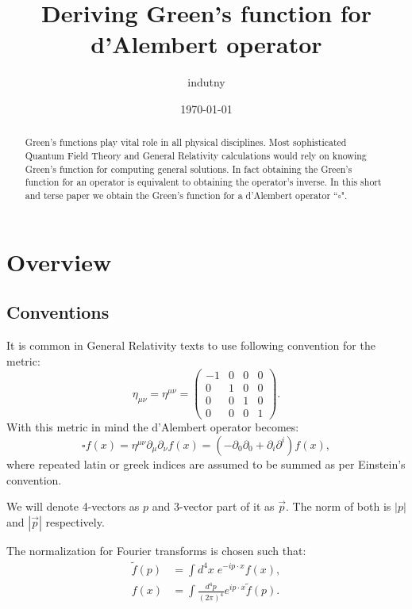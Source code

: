 \documentclass[aps,prd,final,twocolumn,floats,floatfix,nofootinbib,10pt]{revtex4-1}
\begin{document}
\title{Deriving Green's function for d'Alembert operator}
\author{indutny}
\date{\today}
\noaffiliation

\begin{abstract}
Green's functions play vital role in all physical disciplines. Most sophisticated Quantum Field Theory and
General Relativity calculations would rely on knowing Green's function for computing general solutions. In fact
obtaining the Green's function for an operator is equivalent to obtaining the operator's inverse. In this short and
terse paper we obtain the Green's function for a d'Alembert operator ``$\square$".
\end{abstract}

\maketitle

\section{Overview}

\subsection{Conventions}

It is common in General Relativity texts to use following convention for the metric:
\begin{equation}
\eta_{\mu\nu} = \eta^{\mu\nu} = \begin{pmatrix}
-1 & 0 & 0 & 0 \\
0 & 1 & 0 & 0 \\
0 & 0 & 1 & 0 \\
0 & 0 & 0 & 1
\end{pmatrix}.
\end{equation}
With this metric in mind the d'Alembert operator becomes:
\begin{equation}
\square f(x) = \eta^{\mu\nu} \partial_\mu \partial_\nu f(x) =
  \left( -\partial_0 \partial_0 + \partial_i \partial^i \right) f(x),
\end{equation}
where repeated latin or greek indices are assumed to be summed as per Einstein's convention.

We will denote 4-vectors as $p$ and 3-vector part of it as $\vec{p}$. The norm of both is $|p|$ and $|\vec{p}|$
respectively.

The normalization for Fourier transforms is chosen such that:
\begin{align}
\tilde{f}(p) & = \int d^4x \; e^{-i p \cdot x } f(x), \\
f(x) & = \int \frac{d^4p}{(2 \pi)^4} e^{i p \cdot x} \tilde{f}(p).
\end{align}
\end{document}
